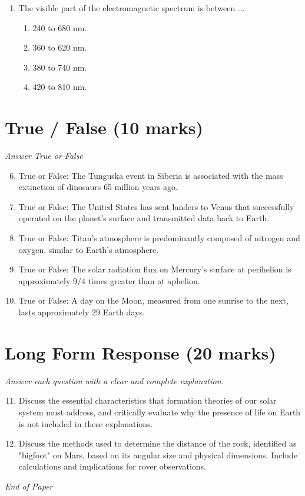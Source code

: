 \documentclass[12pt]{article}
\begin{document}
\begin{enumerate}[label=\arabic*.]
\begin{enumerate}[label=(\alph*)]
    \item 150 million km
    \item 170 million km
    \item 190 million km
\end{enumerate}
\item The visible part of the electromagnetic spectrum is between ...
\begin{enumerate}[label=(\alph*)]
    \item 240 to 680 nm.
    \item 360 to 620 nm.
    \item 380 to 740 nm.
    \item 420 to 810 nm.
\end{enumerate}
\end{enumerate}

\section*{True / False (10 marks)}
\textit{Answer True or False}
\begin{enumerate}[label=\arabic*.]
\setcounter{enumi}{5}
\item True or False: The Tunguska event in Siberia is associated with the mass extinction of dinosaurs 65 million years ago.
\item True or False: The United States has sent landers to Venus that successfully operated on the planet's surface and transmitted data back to Earth.
\item True or False: Titan's atmosphere is predominantly composed of nitrogen and oxygen, similar to Earth's atmosphere.
\item True or False: The solar radiation flux on Mercury's surface at perihelion is approximately 9/4 times greater than at aphelion.
\item True or False: A day on the Moon, measured from one sunrise to the next, lasts approximately 29 Earth days.
\end{enumerate}

\section*{Long Form Response (20 marks)}
\textit{Answer each question with a clear and complete explanation.}
\begin{enumerate}[label=\arabic*.]
\setcounter{enumi}{10}
\item Discuss the essential characteristics that formation theories of our solar system must address, and critically evaluate why the presence of life on Earth is not included in these explanations.
\item Discuss the methods used to determine the distance of the rock, identified as "bigfoot" on Mars, based on its angular size and physical dimensions. Include calculations and implications for rover observations.
\end{enumerate}

\vfill
\noindent\textit{End of Paper}
\end{document}
